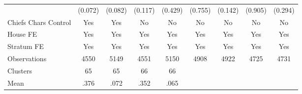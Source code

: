 {\begin{tabular}{l*{8}{c}}
                &  (0.072)         &  (0.082)         &  (0.117)         &  (0.429)         &  (0.755)         &  (0.142)         &  (0.905)         &  (0.294)         \\
Chiefs Chars Control &      Yes         &      Yes         &       No         &       No         &       No         &       No         &       No         &       No         \\
House FE        &      Yes         &      Yes         &      Yes         &      Yes         &      Yes         &      Yes         &      Yes         &      Yes         \\
Stratum FE      &      Yes         &      Yes         &      Yes         &      Yes         &      Yes         &      Yes         &      Yes         &      Yes         \\
\midrule
Observations    &     4550         &     5149         &     4551         &     5150         &     4908         &     4922         &     4725         &     4731         \\
Clusters        &       65         &       65         &       66         &       66         &                  &                  &                  &                  \\
Mean            &     .376         &     .072         &     .352         &     .065         &                  &                  &                  &                  \\
\bottomrule
\end{tabular}
}

